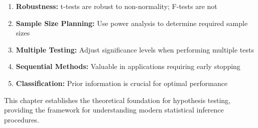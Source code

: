 \begin{enumerate}
	\item \textbf{Robustness:} t-tests are robust to non-normality; F-tests are not
	\item \textbf{Sample Size Planning:} Use power analysis to determine required sample sizes
	\item \textbf{Multiple Testing:} Adjust significance levels when performing multiple tests
	\item \textbf{Sequential Methods:} Valuable in applications requiring early stopping
	\item \textbf{Classification:} Prior information is crucial for optimal performance
\end{enumerate}

This chapter establishes the theoretical foundation for hypothesis testing, providing the framework for understanding modern statistical inference procedures.
